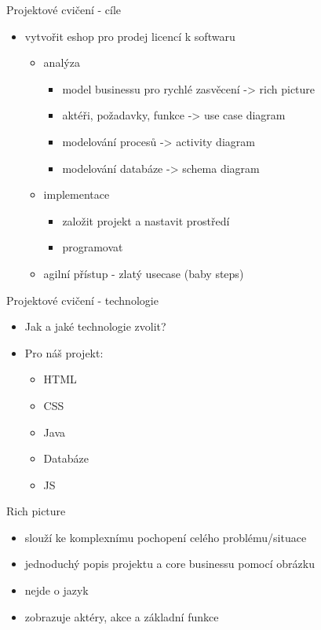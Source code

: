 \documentclass{beamer}
\begin{document}
\begin{frame}{Projektové cvičení - cíle}
	\begin{itemize}
		\item vytvořit eshop pro prodej licencí k softwaru
		\begin{itemize}
			\item analýza
			\begin{itemize}
				\item model businessu pro rychlé zasvěcení -> rich picture
				\item aktéři, požadavky, funkce -> use case diagram
				\item modelování procesů -> activity diagram
				\item modelování databáze -> schema diagram
			\end{itemize}
			\item implementace
			\begin{itemize}
				\item založit projekt a nastavit prostředí
				\item programovat
			\end{itemize}		
			\item agilní přístup - zlatý usecase (baby steps) 	
		\end{itemize}
	\end{itemize}
\end{frame}

\begin{frame}{Projektové cvičení - technologie}
	\begin{itemize}
		\item Jak a jaké technologie zvolit?
		\item Pro náš projekt:
		\begin{itemize}
			\item HTML
			\item CSS
			\item Java
			\item Databáze
			\item JS
		\end{itemize}
	\end{itemize}
\end{frame}

\begin{frame}{Rich picture}
	\begin{itemize}
		\item slouží ke komplexnímu pochopení celého problému/situace
		\item jednoduchý popis projektu a core businessu pomocí obrázku
		\item nejde o jazyk
	\end{itemize}

	\begin{itemize}
		\item zobrazuje aktéry, akce a základní funkce
	\end{itemize}
\end{frame}
\end{document}
